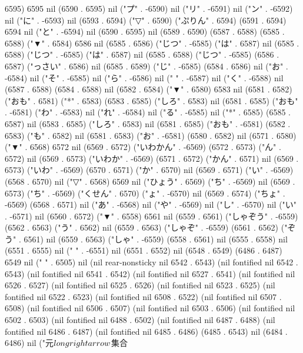 6595) 6595 nil (6590 . 6595) nil ("プ" . -6590) nil ("リ" . -6591) nil ("ン" . -6592) nil ("に" . -6593) nil (6593 . 6594) ("▽" . 6590) ("ぷりん" . 6594) (6591 . 6594) 6594 nil ("と" . -6594) nil (6590 . 6595) nil (6589 . 6590) (6587 . 6588) (6585 . 6588) ("▼" . 6584) 6586 nil (6585 . 6586) ("じつ" . -6585) ("は" . 6587) nil (6585 . 6588) ("じつ" . -6585) ("は" . 6587) nil (6585 . 6588) ("じつ" . -6585) (6586 . 6587) ("っさい" . 6586) nil (6585 . 6589) ("じ" . -6585) (6584 . 6586) nil ("お" . -6584) nil ("そ" . -6585) nil ("ら" . -6586) nil ("
" . -6587) nil ("く" . -6588) nil (6587 . 6588) (6584 . 6588) nil (6582 . 6584) ("▼" . 6580) 6583 nil (6581 . 6582) ("おも" . 6581) ("*" . 6583) (6583 . 6585) ("しろ" . 6583) nil (6581 . 6585) ("おも" . -6581) ("わ" . -6583) nil ("れ" . -6584) nil ("る" . -6585) nil ("*" . 6585) (6585 . 6587) nil (6583 . 6585) ("しろ" . 6583) nil (6581 . 6585) ("おも" . -6581) (6582 . 6583) ("も" . 6582) nil (6581 . 6583) ("お" . -6581) (6580 . 6582) nil (6571 . 6580) ("▼" . 6568) 6572 nil (6569 . 6572) ("いわかん" . -6569) (6572 . 6573) ("ん" . 6572) nil (6569 . 6573) ("いわか" . -6569) (6571 . 6572) ("かん" . 6571) nil (6569 . 6573) ("いわ" . -6569) (6570 . 6571) ("か" . 6570) nil (6569 . 6571) ("い" . -6569) (6568 . 6570) nil ("▽" . 6568) 6569 nil ("ひょう" . 6569) ("ち" . -6569) nil (6569 . 6573) ("ち" . -6569) ("くせん" . 6570) ("ょ" . -6570) nil (6569 . 6574) ("ちょ" . -6569) (6568 . 6571) nil ("あ" . -6568) nil ("や" . -6569) nil ("し" . -6570) nil ("い" . -6571) nil (6560 . 6572) ("▼" . 6558) 6561 nil (6559 . 6561) ("しゃぞう" . -6559) (6562 . 6563) ("う" . 6562) nil (6559 . 6563) ("しゃぞ" . -6559) (6561 . 6562) ("ぞう" . 6561) nil (6559 . 6563) ("しゃ" . -6559) (6558 . 6561) nil (6555 . 6558) nil (6551 . 6555) nil ("
" . -6551) nil (6551 . 6552) nil (6548 . 6549) (6486 . 6487) 6549 nil ("
" . 6505) nil (nil rear-nonsticky nil 6542 . 6543) (nil fontified nil 6542 . 6543) (nil fontified nil 6541 . 6542) (nil fontified nil 6527 . 6541) (nil fontified nil 6526 . 6527) (nil fontified nil 6525 . 6526) (nil fontified nil 6523 . 6525) (nil fontified nil 6522 . 6523) (nil fontified nil 6508 . 6522) (nil fontified nil 6507 . 6508) (nil fontified nil 6506 . 6507) (nil fontified nil 6503 . 6506) (nil fontified nil 6502 . 6503) (nil fontified nil 6488 . 6502) (nil fontified nil 6487 . 6488) (nil fontified nil 6486 . 6487) (nil fontified nil 6485 . 6486) (6485 . 6543) nil (6484 . 6486) nil ("元$\\longrightarrow$集合
